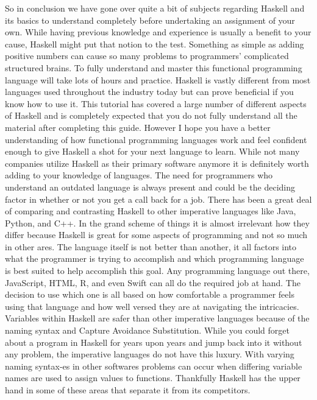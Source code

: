 \documentclass{article}
\begin{document}
So in conclusion we have gone over quite a bit of subjects regarding Haskell and its basics to understand completely before undertaking an assignment of your own. While having previous knowledge and experience is usually a benefit to your cause, Haskell might put that notion to the test. Something as simple as adding positive numbers can cause so many problems to programmers' complicated structured brains. To fully understand and master this functional programming language will take lots of hours and practice. Haskell is vastly different from most languages used throughout the industry today but can prove beneficial if you know how to use it. This tutorial has covered a large number of different aspects of Haskell and is completely expected that you do not fully understand all the material after completing this guide. However I hope you have a better understanding of how functional programming languages work and feel confident enough to give Haskell a shot for your next language to learn. While not many companies utilize Haskell as their primary software anymore it is definitely worth adding to your knowledge of languages. The need for programmers who understand an outdated language is always present and could be the deciding factor in whether or not you get a call back for a job. There has been a great deal of comparing and contrasting Haskell to other imperative languages like Java, Python, and C++. In the grand scheme of things it is almost irrelevant how they differ because Haskell is great for some aspects of programming and not so much in other ares. The language itself is not better than another, it all factors into what the programmer is trying to accomplish and which programming language is best suited to help accomplish this goal. Any programming language out there, JavaScript, HTML, R, and even Swift can all do the required job at hand. The decision to use which one is all based on how comfortable a programmer feels using that language and how well versed they are at navigating the intricacies. Variables within Haskell are safer than other imperative languages because of the naming syntax and Capture Avoidance Substitution. While you could forget about a program in Haskell for years upon years and jump back into it without any problem, the imperative languages do not have this luxury. With varying naming syntax-es in other softwares problems can occur when differing variable names are used to assign values to functions. Thankfully Haskell has the upper hand in some of these areas that separate it from its competitors.
\end{document}

